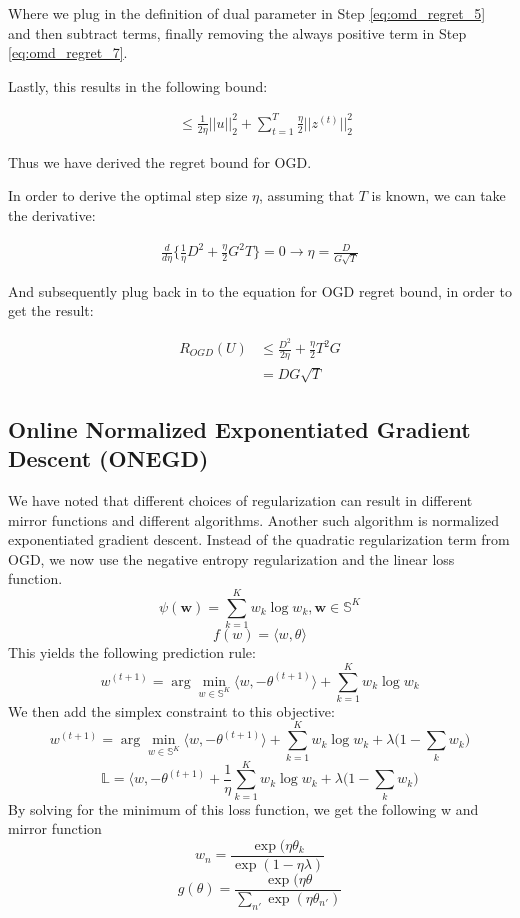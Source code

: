 \documentclass[11pt]{article}
\begin{document}
Where we plug in the definition of dual parameter in Step \ref{eq:omd_regret_5} and then subtract terms, finally removing the always positive term in Step \ref{eq:omd_regret_7}.

Lastly, this results in the following bound:

\begin{align}
    &\leq \frac{1}{2\eta}||u||_2^2 + \sum_{t=1}^T \frac{\eta}{2}|| z^{(t)} ||_2^2  \label{eq:omd_regret_8}
\end{align}

Thus we have derived the regret bound for OGD.

In order to derive the optimal step size $\eta$, assuming that $T$ is known, we can take the derivative:

\begin{align}
    \frac{d}{d\eta} \{\frac{1}{\eta} D^2 + \frac{\eta}{2} G^2T \} = 0 \rightarrow \eta = \frac{D}{G\sqrt{T}}
\end{align}

And subsequently plug back in to the equation for OGD regret bound, in order to get the result:

\begin{align}
    R_{OGD}(U) &\leq \frac{D^2}{2\eta} + \frac{\eta}{2} T^2G \\
    &= DG\sqrt{T}
\end{align}

\subsection{Online Normalized Exponentiated Gradient Descent (ONEGD)}

We have noted that different choices of regularization can result in different mirror functions and different algorithms. Another such algorithm is normalized exponentiated gradient descent. Instead of the quadratic regularization term from OGD, we now use the negative entropy regularization and the linear loss function. 
$$\psi(\textbf{w}) = \sum\limits_{k=1}^{K} w_k \log w_k, \textbf{w} \in \mathbb{S}^K$$
$$f(w) = \langle w, \theta \rangle $$
This yields the following prediction rule:
$$w^{(t+1)} = \arg \min\limits_{w \in \mathbb{S}^K} \langle w, -\theta^{(t+1)} \rangle + \sum\limits_{k=1}^K w_k \log w_k $$
We then add the simplex constraint to this objective:
$$w^{(t+1)} = \arg \min\limits_{w \in \mathbb{S}^K} \langle w, -\theta^{(t+1)} \rangle + \sum\limits_{k=1}^K w_k \log w_k + \lambda \Big( 1 - \sum_{k} w_k\Big)$$
$$\mathbb{L} = \langle w, -\theta^{(t+1)} + \frac{1}{\eta} \sum\limits_{k=1}^K w_k \log w_k  + \lambda \big( 1-\sum_k w_k \big)$$
By solving for the minimum of this loss function, we get the following w and mirror function
$$w_n = \frac{\exp (\eta \theta_k}{\exp(1- \eta \lambda)}$$
$$g(\theta) = \frac{\exp (\eta \theta}{\sum\limits_{n'}\exp(\eta \theta_{n'})}$$
\end{document}
